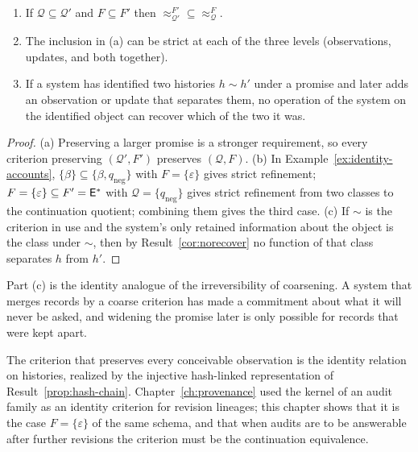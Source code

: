 \begin{newresult}\label{prop:promise-refine}
\begin{enumerate}[nosep,label=(\alph*)]
  \item If $\mathcal Q\subseteq\mathcal Q'$ and $F\subseteq F'$ then $\approx^{F'}_{\mathcal Q'}\subseteq\approx^{F}_{\mathcal Q}$.
  \item The inclusion in (a) can be strict at each of the three levels (observations, updates, and both together).
  \item If a system has identified two histories $h\sim h'$ under a promise and later adds an observation or update that separates them, no operation of the system on the identified object can recover which of the two it was.
\end{enumerate}
\end{newresult}
\begin{proof}
(a) Preserving a larger promise is a stronger requirement, so every criterion preserving $(\mathcal Q',F')$ preserves $(\mathcal Q,F)$. (b) In Example~\ref{ex:identity-accounts}, $\{\beta\}\subseteq\{\beta,q_{\mathrm{neg}}\}$ with $F=\{\varepsilon\}$ gives strict refinement; $F=\{\varepsilon\}\subseteq F'=\mathsf{E}^{*}$ with $\mathcal Q=\{q_{\mathrm{neg}}\}$ gives strict refinement from two classes to the continuation quotient; combining them gives the third case. (c) If $\sim$ is the criterion in use and the system's only retained information about the object is the class under $\sim$, then by Result~\ref{cor:norecover} no function of that class separates $h$ from $h'$.
\end{proof}

Part (c) is the identity analogue of the irreversibility of coarsening. A system that merges records by a coarse criterion has made a commitment about what it will never be asked, and widening the promise later is only possible for records that were kept apart.

\begin{remark}
The criterion that preserves every conceivable observation is the identity relation on histories, realized by the injective hash-linked representation of Result~\ref{prop:hash-chain}. Chapter~\ref{ch:provenance} used the kernel of an audit family as an identity criterion for revision lineages; this chapter shows that it is the case $F=\{\varepsilon\}$ of the same schema, and that when audits are to be answerable after further revisions the criterion must be the continuation equivalence.
\end{remark}


